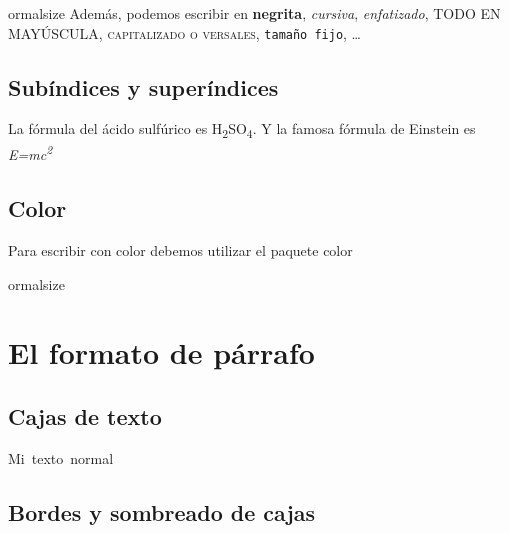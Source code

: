 \documentclass[11pt,twoside,a4paper]{article}
\begin{document}
ormalsize
Además, podemos escribir en \textbf{negrita}, \textit{cursiva}, \emph{enfatizado}, \uppercase{todo en mayúscula}, \textsc{capitalizado o versales}, \texttt{tamaño fijo}, \ldots

\subsection{Subíndices y superíndices}
\label{sec:subysuper}

La fórmula del ácido sulfúrico es H\textsubscript{2}SO\textsubscript{4}. Y la famosa fórmula de Einstein es \textit{E=mc\textsuperscript{2}}

\subsection{Color}
\label{sec:color}
Para escribir con color debemos utilizar el paquete \color{red}\huge color

ormalsize

\color{black}
\section{El formato de párrafo}
\label{sec:formatoparrafo}

\subsection{Cajas de texto}
\label{sec:cajastexto}
\mbox{Mi texto normal}








\subsection{Bordes y sombreado de cajas}
\label{sec:bordesysombreadocajas}
{\fboxsep 8pt \fboxrule 1pt  %
} %
\end{document}
